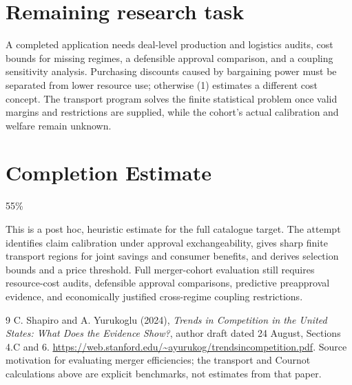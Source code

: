 \documentclass[11pt,a4paper]{article}
\begin{document}
\section{Remaining research task}
A completed application needs deal-level production and logistics audits, cost bounds for missing regimes, a defensible approval comparison, and a coupling sensitivity analysis. Purchasing discounts caused by bargaining power must be separated from lower resource use; otherwise (1) estimates a different cost concept. The transport program solves the finite statistical problem once valid margins and restrictions are supplied, while the cohort's actual calibration and welfare remain unknown.

\section{Completion Estimate}
55\%

This is a post hoc, heuristic estimate for the full catalogue target.
The attempt identifies claim calibration under approval exchangeability, gives sharp finite transport regions for joint savings and consumer benefits, and derives selection bounds and a price threshold. Full merger-cohort evaluation still requires resource-cost audits, defensible approval comparisons, predictive preapproval evidence, and economically justified cross-regime coupling restrictions.

\begin{thebibliography}{9}
 C. Shapiro and A. Yurukoglu (2024), \emph{Trends in Competition in the United States: What Does the Evidence Show?}, author draft dated 24 August, Sections 4.C and 6. \url{https://web.stanford.edu/~ayurukog/trendsincompetition.pdf}. Source motivation for evaluating merger efficiencies; the transport and Cournot calculations above are explicit benchmarks, not estimates from that paper.
\end{thebibliography}
\end{document}
